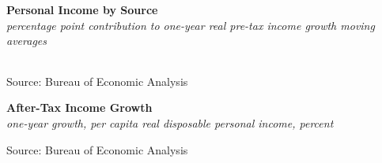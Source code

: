 \documentclass{report}
\makeatletter
\newcommand{\tbllink}[1]{\href{https://raw.githubusercontent.com/bdecon/US-chartbook/master/chartbook/data/#1}{\faTable}}
\newcommand*\short[1]{\expandafter\@gobbletwo\number\numexpr#1\relax}
\newcommand{\dateaxisticks}{
		date coordinates in=x, axis line style={draw=none},
		xmax={2023-11-01},
		max space between ticks=40,	    
		xtick={{1990-01-01}, {1992-01-01}, {1994-01-01}, 
			{1996-01-01}, {1998-01-01}, {2000-01-01}, 
			{2002-01-01}, {2004-01-01}, {2006-01-01},
			{2008-01-01}, {2010-01-01}, {2012-01-01}, {2014-01-01},
		    {2016-01-01}, {2018-01-01}, {2020-01-01}, {2022-01-01}, 
		    {2024-01-01}, {2026-01-01}},
		minor xtick={{1989-01-01}, {1991-01-01}, {1993-01-01},
			{1995-01-01}, {1997-01-01}, {1999-01-01}, 
			{2001-01-01}, {2003-01-01}, {2005-01-01}, {2007-01-01},
		    {2009-01-01}, {2011-01-01}, {2013-01-01}, {2015-01-01},
		    {2017-01-01}, {2019-01-01}, {2021-01-01}, {2023-01-01}, 
		    {2025-01-01}, {2027-01-01}},
		enlarge y limits={0.06}, enlarge x limits={0.01},
		}
\newcommand{\bbar}[2]{extra #1 ticks = {{#2}}, extra #1 tick labels = ,
		extra #1 tick style = {grid=major, grid style={thick, black!25}},}
\newcommand{\stdline}[4]{\addplot[very thick, no markers, color=#1] 
		table [x=#2, y=#3, col sep=comma] {#4};	}
\newcommand{\rbars}{
		\fill[color=black!10] (axis cs:{1990-07-01},\pgfkeysvalueof{/pgfplots/ymin}) rectangle 
			(axis cs:{1991-03-01}, \pgfkeysvalueof{/pgfplots/ymax});
		\fill[color=black!10] (axis cs:{2007-12-01},\pgfkeysvalueof{/pgfplots/ymin}) rectangle 
			(axis cs:{2009-07-01}, \pgfkeysvalueof{/pgfplots/ymax});
		\fill[color=black!10] (axis cs:{2001-03-01},\pgfkeysvalueof{/pgfplots/ymin}) rectangle 
			(axis cs:{2001-11-01}, \pgfkeysvalueof{/pgfplots/ymax});
		\fill[color=black!10] (axis cs:{2020-02-01},\pgfkeysvalueof{/pgfplots/ymin}) rectangle 
			(axis cs:{2020-05-01}, \pgfkeysvalueof{/pgfplots/ymax});}
\makeatother
\begin{document}
{\begin{minipage}{0.76\textwidth}
\small  
\end{minipage}
\vspace{1mm}

\begin{minipage}{0.89\textwidth}
\normalsize \textbf{Personal Income by Source}\\
\footnotesize{\textit{percentage point contribution to one-year real pre-tax income growth \hspace{22mm} moving averages}}\\
 \setlength{\tabcolsep}{3.8pt} \color{black!90}
	{\renewcommand{\arraystretch}{1.56}
\hspace*{-2mm} \begin{tabular}{p{46mm} R{8.2mm} R{8.2mm} R{8.2mm} R{8.2mm} R{8.2mm} 
		   R{7.8mm} R{7.4mm} R{7.4mm} }
			  \hline
		\end{tabular}}\vspace{-2mm}
		
\footnotesize{Source: Bureau of Economic Analysis}
\end{minipage}
\newpage
\vspace*{-9mm}

\begin{minipage}{0.76\textwidth}   
\small 
\vspace{2mm}

\normalsize \textbf{After-Tax Income Growth}\\
\footnotesize{\textit{one-year growth, per capita real disposable personal income, percent}}
\vspace{5.6cm}

\hspace{3mm} 

\footnotesize{Source: Bureau of Economic Analysis}  \hfill \tbllink{rdpigrowth.csv}
\vspace{2mm}


\end{minipage}}
\end{document}
